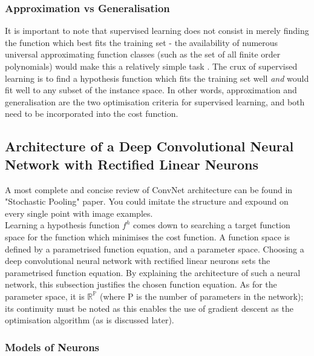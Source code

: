 \documentclass[a4paper,11pt]{article}
\begin{document}
\subsubsection{Approximation vs Generalisation}

It is important to note that supervised learning does not consist in merely finding the function which best fits the training set - the availability of numerous universal approximating function classes (such as the set of all finite order polynomials) would make this a relatively simple task \cite{univ-approx}. The crux of supervised learning is to find a hypothesis function which fits the training set well \textit{and} would fit well to any subset of the instance space. In other words, approximation and generalisation are the two optimisation criteria for supervised learning, and both need to be incorporated into the cost function.\\

\subsection{Architecture of a Deep Convolutional Neural Network with Rectified Linear Neurons}

A most complete and concise review of ConvNet architecture can be found in "Stochastic Pooling" paper. You could imitate the structure and expound on every single point with image examples. \\

Learning a hypothesis function $f^{h}$ comes down to searching a target function space for the function which minimises the cost function. A function space is defined by a parametrised function equation, and a parameter space. Choosing a deep convolutional neural network with rectified linear neurons sets the parametrised function equation. By explaining the architecture of such a neural network, this subsection justifies the chosen function equation. As for the parameter space, it is $\mathbb{R^{P}}$ (where P is the number of parameters in the network); its continuity must be noted as this enables the use of gradient descent as the optimisation algorithm (as is discussed later). \\



\subsubsection{Models of Neurons}
\end{document}

